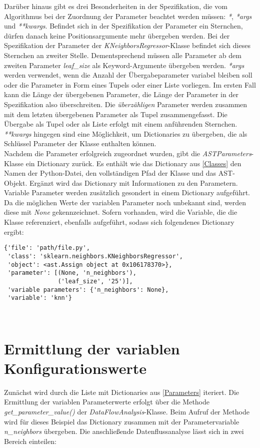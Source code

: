 \documentclass[german,bachelor]{swsLeipzig}
\begin{document}
Darüber hinaus gibt es drei Besonderheiten in der Spezifikation, die vom Algorithmus bei der Zuordnung der Parameter
beachtet werden müssen: \textit{*}, \textit{*args} und \textit{**kwargs}.
Befindet sich in der Spezifikation der Parameter ein Sternchen, dürfen danach keine Positionsargumente mehr
übergeben werden.
Bei der Spezifikation der Parameter der \textit{KNeighborsRegressor}-Klasse befindet sich dieses Sternchen an zweiter Stelle.
Dementsprechend müssen alle Parameter ab dem zweiten Parameter \textit{leaf\_size} als Keyword-Argumente übergeben werden.
\textit{*args} werden verwendet, wenn die Anzahl der Übergabeparameter variabel bleiben soll oder die Parameter in Form
eines Tupels oder einer Liste vorliegen.
Im ersten Fall kann die Länge der übergebenen Parameter, die Länge der Parameter in der Spezifikation also überschreiten.
Die \textit{überzähligen} Parameter werden zusammen mit dem letzten übergebenen Parameter als Tupel zusammengefasst.
Die Übergabe als Tupel oder als Liste erfolgt mit einem anführenden Sternchen.
\textit{**kwargs} hingegen sind eine Möglichkeit, um Dictionaries zu übergeben, die als Schlüssel Parameter der Klasse
enthalten können. \\

Nachdem die Parameter erfolgreich zugeordnet wurden, gibt die \textit{ASTParameters}-Klasse ein Dictionary zurück.
Es enthält wie das Dictionary aus \ref{Classes} den Namen der Python-Datei, den vollständigen Pfad der Klasse und das AST-Objekt.
Ergänzt wird das Dictionary mit Informationen zu den Parametern.
Variable Parameter werden zusätzlich gesondert in einem Dictionary aufgeführt.
Da die möglichen Werte der variablen Parameter noch unbekannt sind, werden diese mit \textit{None} gekennzeichnet.
Sofern vorhanden, wird die Variable, die die Klasse referenziert, ebenfalls aufgeführt, sodass sich folgendenes Dictionary ergibt:\\

\begin{lstlisting}[frame=single, basicstyle=\small]
{'file': 'path/file.py',
 'class': 'sklearn.neighbors.KNeighborsRegressor',
 'object': <ast.Assign object at 0x106178370>},
 'parameter': [(None, 'n_neighbors'),
               ('leaf_size', '25')],
 'variable parameters': {'n_neighbors': None},
 'variable': 'knn'}
\end{lstlisting}
\

\section{Ermittlung der variablen Konfigurationswerte}
Zunächst wird durch die Liste mit Dictionaries aus \ref{Parameters} iteriert.
Die Ermittlung der variablen Parameterwerte erfolgt über die Methode \textit{get\_parameter\_value()} der \textit{DataFlowAnalysis}-Klasse.
Beim Aufruf der Methode wird für dieses Beispiel das Dictionary zusammen mit der Parametervariable \textit{n\_neighbors} übergeben.
Die anschließende Datenflussanalyse lässt sich in zwei Bereich einteilen:
\end{document}
